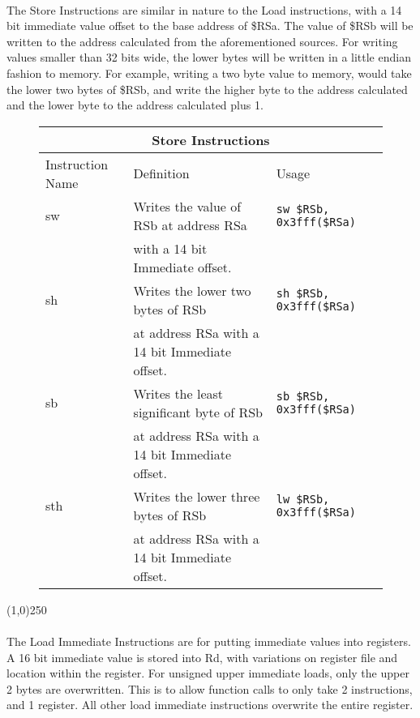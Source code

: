 \documentclass[letterpaper, 11pt]{article}
\begin{document}
\paragraph{} The Store Instructions are similar in nature to the Load instructions, with a 14 bit immediate value offset to the base address of \$RSa.
The value of \$RSb will be written to the address calculated from the aforementioned sources. For writing values smaller than 32 bits wide, the lower
bytes will be written in a little endian fashion to memory. For example, writing a two byte value to memory, would take the lower two bytes of \$RSb, and write
the higher byte to the address calculated and the lower byte to the address calculated plus 1. 
\begin{figure}[!h]
	\begin{center}
		\begin{tabular}{|l|l|l|}
			\hline
			\multicolumn{3}{c}{Store Instructions} \\ \hline
			Instruction Name	& Definition											& Usage 							\\ \hline
			sw					& Writes the value of RSb at address RSa				& \texttt{sw \$RSb, 0x3fff(\$RSa)}	\\ 
			\hfill				& with a 14 bit Immediate offset.						& \hfill 							\\ \hline
			sh					& Writes the lower two bytes of RSb 					& \texttt{sh \$RSb, 0x3fff(\$RSa)}	\\ 
			\hfill				& at address RSa with a 14 bit Immediate offset.		& \hfill 							\\ \hline
			sb					& Writes the least significant byte of RSb 				& \texttt{sb \$RSb, 0x3fff(\$RSa)}	\\ 
			\hfill				& at address RSa with a 14 bit Immediate offset.		& \hfill 							\\ \hline
			sth					& Writes the lower three bytes of RSb 					& \texttt{lw \$RSb, 0x3fff(\$RSa)}	\\ 
			\hfill				& at address RSa with a 14 bit Immediate offset.		& \hfill 							\\ \hline
		 		\end{tabular} 
	\end{center}
	
\end{figure}

\begin{center}
	\line(1,0){250}
\end{center}
\clearpage
\paragraph{} The Load Immediate Instructions are for putting immediate values into registers. A 16 bit immediate value is stored into Rd, with variations on
register file and location within the register. For unsigned upper immediate loads, only the upper 2 bytes are
overwritten. This is to allow function calls to only take 2 instructions, and 1 register. All other
load immediate instructions overwrite the entire register.
\end{document}
